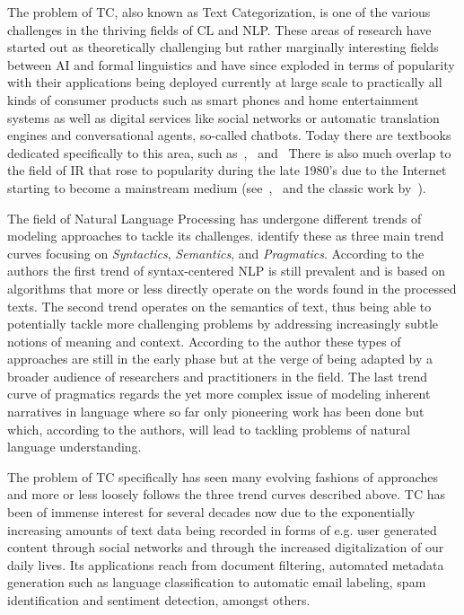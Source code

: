 
The problem of \gls{TC}, also known as Text Categorization, is one of the various challenges in the thriving fields of \gls{CL} and \gls{NLP}. These areas of research have started out as theoretically challenging but rather marginally interesting fields between \gls{AI} and formal linguistics and have since exploded in terms of popularity with their applications being deployed currently at large scale to practically all kinds of consumer products such as smart phones and home entertainment systems as well as digital services like social networks or automatic translation engines and conversational agents, so-called chatbots.
Today there are textbooks dedicated specifically to this area, such as~\cite{Manning:1999aa},~\cite{Jurafsky:2014aa} and~\cite{Clark:2013aa} There is also much overlap to the field of \gls{IR} that rose to popularity during the late 1980's due to the Internet starting to become a mainstream medium (see~\cite{Manning:2008aa},~\cite{Leskovec:2014aa} and the classic work by~\cite{Rijsbergen:1979aa}).

The field of Natural Language Processing has undergone different trends of modeling approaches to tackle its challenges. \cite{Cambria:2014aa} identify these as three main trend curves focusing on \emph{Syntactics}, \emph{Semantics}, and \emph{Pragmatics}. According to the authors the first trend of syntax-centered NLP is still prevalent and is based on algorithms that more or less directly operate on the words found in the processed texts.
The second trend operates on the semantics of text, thus being able to potentially tackle more challenging problems by addressing increasingly subtle notions of meaning and context. According to the author these types of approaches are still in the early phase but at the verge of being adapted by a broader audience of researchers and practitioners in the field.
The last trend curve of pragmatics regards the yet more complex issue of modeling inherent narratives in language where so far only pioneering work has been done but which, according to the authors, will lead to tackling problems of natural language understanding.

The problem of \gls{TC} specifically has seen many evolving fashions of approaches and more or less loosely follows the three trend curves described above. \gls{TC} has been of immense interest for several decades now due to the exponentially increasing amounts of text data being recorded in forms of e.g. user generated content through social networks and through the increased digitalization of our daily lives. Its applications reach from document filtering, automated metadata generation such as language classification to automatic email labeling, spam identification and sentiment detection, amongst others.

